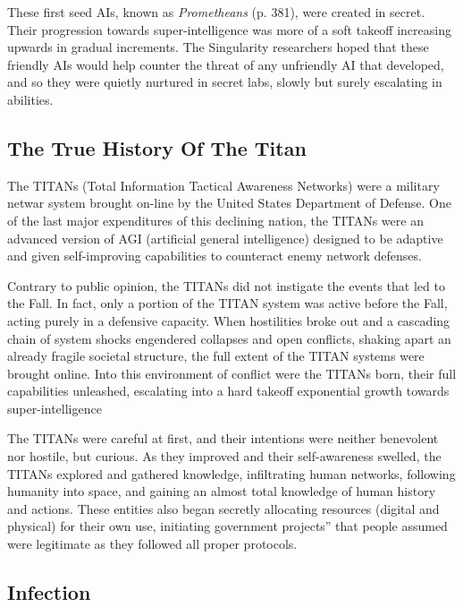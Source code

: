 These first seed AIs, known as \textit{Prometheans }
(p. 381), were created in secret. Their progression 
towards super-intelligence was more of a soft takeoff
increasing upwards in gradual increments. The
Singularity researchers hoped that these friendly AIs 
would help counter the threat of any unfriendly AI 
that developed, and so they were quietly nurtured in 
secret labs, slowly but surely escalating in abilities. 

\subsection{The True History Of The Titan}

The TITANs (Total Information Tactical Awareness 
Networks) were a military netwar system brought 
on-line by the United States Department of Defense. 
One of the last major expenditures of this declining 
nation, the TITANs were an advanced version of AGI 
(artificial general intelligence) designed to be adaptive 
and given self-improving capabilities to counteract 
enemy network defenses. 

Contrary to public opinion, the TITANs did not 
instigate the events that led to the Fall. In fact, only 
a portion of the TITAN system was active before 
the Fall, acting purely in a defensive capacity. When 
hostilities broke out and a cascading chain of system 
shocks engendered collapses and open conflicts, shaking
apart an already fragile societal structure, the full
extent of the TITAN systems were brought online. 
Into this environment of conflict were the TITANs 
born, their full capabilities unleashed, escalating into 
a hard takeoff exponential growth towards super-intelligence


The TITANs were careful at first, and their 
intentions were neither benevolent nor hostile, but 
curious. As they improved and their self-awareness 
swelled, the TITANs explored and gathered 
knowledge, infiltrating human networks, following 
humanity into space, and gaining an almost total 
knowledge of human history and actions. These entities
also began secretly allocating resources (digital
and physical) for their own use, initiating government
projects'' that people assumed were legitimate
as they followed all proper protocols.

\subsection{Infection}

